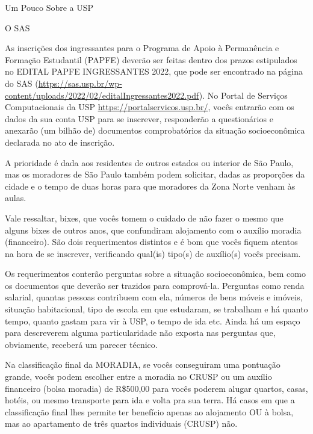 \begin{secao}{Um Pouco Sobre a USP}
\begin{subsecao}{O SAS}


As inscrições dos ingressantes para o Programa de Apoio à Permanência e Formação Estudantil (PAPFE)
deverão ser feitas dentro dos prazos estipulados no EDITAL PAPFE INGRESSANTES 2022, que pode 
ser encontrado na página do SAS (\url{https://sas.usp.br/wp-content/uploads/2022/02/editalIngressantes2022.pdf}).
No Portal de Serviços Computacionais da USP \url{https://portalservicos.usp.br/}, vocês entrarão 
com os dados da sua conta USP para se inscrever, responderão a questionários e anexarão (um bilhão de) 
documentos comprobatórios da situação socioeconômica declarada no ato de inscrição.

A prioridade é dada aos residentes de outros estados ou interior de São Paulo,
mas os moradores de São Paulo também podem solicitar, dadas as proporções da
cidade e o tempo de duas horas para que moradores da Zona Norte venham às aulas.

Vale ressaltar, bixes, que vocês tomem o cuidado de não fazer o mesmo que alguns
bixes de outros anos, que confundiram alojamento com o auxílio moradia (financeiro). São dois
requerimentos distintos e é bom que vocês fiquem atentos na hora de se inscrever, verificando
qual(is) tipo(s) de auxílio(s) vocês precisam.

Os requerimentos conterão perguntas sobre a situação socioeconômica, bem como os
documentos que deverão ser trazidos para comprová-la. Perguntas como renda
salarial, quantas pessoas contribuem com ela, números de bens móveis e imóveis,
situação habitacional, tipo de escola em que estudaram, se trabalham e há quanto
tempo, quanto gastam para vir à USP, o tempo de ida etc. Ainda há um espaço
para descreverem alguma particularidade não exposta nas perguntas que, obviamente,
receberá um parecer técnico.

Na classificação final da MORADIA, se vocês conseguiram uma pontuação grande, vocês
podem escolher entre a moradia no CRUSP ou um auxílio financeiro (bolsa moradia)
de R\$500,00 para vocês poderem alugar quartos, casas, hotéis, ou mesmo transporte
para ida e volta pra sua terra. Há casos em que a classificação final lhes permite
ter benefício apenas ao alojamento OU à bolsa, mas ao apartamento de três quartos
individuais (CRUSP) não.


\end{subsecao}
\end{secao}
